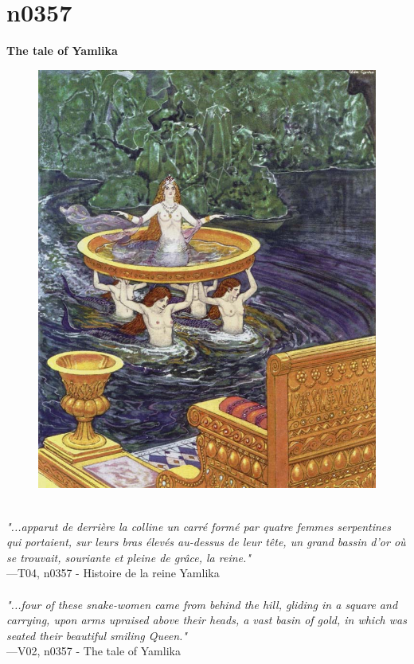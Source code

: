 \documentclass[../Carre_nights.tex]{subfiles}
\begin{document}
\newpage

\section{n0357}
\textbf{\Large{The tale of Yamlika}} \\

\begin{figure}[ht]
\centering
\includegraphics[height=\figsize]{illustrations/volume_4/T04, n0357 - Histoire de la reine Yamlika.jpg}
\end{figure}

\textit{\\
"...apparut de derrière la colline un carré formé par quatre femmes serpentines qui portaient, sur leurs bras élevés au-dessus de leur tête, un grand bassin d’or où se trouvait, souriante et pleine de grâce, la reine."} \\
—T04, n0357 - Histoire de la reine Yamlika \\~\\
\textit{"...four of these snake-women came from behind the hill, gliding in a square and carrying, upon arms upraised above their heads, a vast basin of gold, in which was seated their beautiful smiling Queen."} \\
—V02, n0357 - The tale of Yamlika
\end{document}
